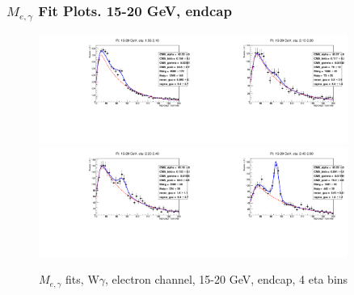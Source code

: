 \begin{frame}\frametitle{$M_{e,\gamma}$ Fit Plots. 15-20 GeV, endcap}
\begin{figure}[htb]
  \begin{center}
   \includegraphics[width=0.45\textwidth]{../figs/figs_v11/ELECTRON_WGamma/EtoGammaFits/sa_hZmass_h_Data_EtoGamma_Enr_ENDCAP_pt15to20_ieta0.pdf}\includegraphics[width=0.45\textwidth]{../figs/figs_v11/ELECTRON_WGamma/EtoGammaFits/sa_hZmass_h_Data_EtoGamma_Enr_ENDCAP_pt15to20_ieta1.pdf}\\
   \includegraphics[width=0.45\textwidth]{../figs/figs_v11/ELECTRON_WGamma/EtoGammaFits/sa_hZmass_h_Data_EtoGamma_Enr_ENDCAP_pt15to20_ieta2.pdf}\includegraphics[width=0.45\textwidth]{../figs/figs_v11/ELECTRON_WGamma/EtoGammaFits/sa_hZmass_h_Data_EtoGamma_Enr_ENDCAP_pt15to20_ieta3.pdf}\\
  \label{fig:etogFits_15to20}
  \caption{$M_{e,\gamma}$ fits, W$\gamma$, electron channel, 15-20 GeV, endcap, 4 eta bins}
  \end{center}
\end{figure}
\end{frame}%
